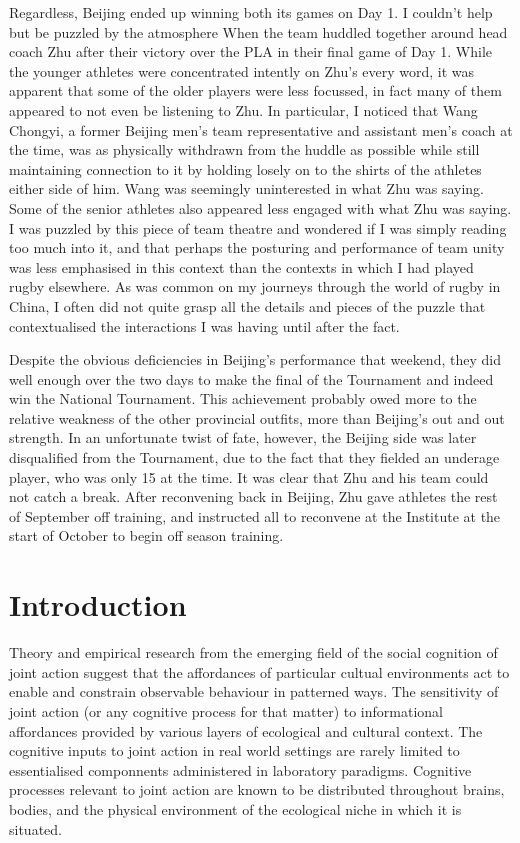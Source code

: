 Regardless, Beijing ended up winning both its games on Day 1. I couldn't help but be puzzled by the atmosphere When the team huddled together around head coach Zhu after their victory over the PLA in their final game of Day 1.  While the younger athletes were concentrated intently on Zhu's every word, it was apparent that some of the older players were less focussed, in fact many of them appeared to not even be listening to Zhu.  In particular, I noticed that Wang Chongyi, a former Beijing men's team representative and assistant men's coach at the time, was as physically withdrawn from the huddle as possible while still maintaining connection to it by holding losely on to the shirts of the athletes either side of him. Wang was seemingly uninterested in what Zhu was saying.  Some of the senior athletes also appeared less engaged with what Zhu was saying.  I was puzzled by this piece of team theatre and wondered if I was simply reading too much into it, and that perhaps the posturing and performance of team unity was less emphasised in this context than the contexts in which I had played rugby elsewhere. As was common on my journeys through the world of rugby in China, I often did not quite grasp all the details and pieces of the puzzle that contextualised the interactions I was having until after the fact.

Despite the obvious deficiencies in Beijing's performance that weekend, they did well enough over the two days to make the final of the Tournament and indeed win the National Tournament.  This achievement probably owed more to the relative weakness of the other provincial outfits, more than Beijing's out and out strength.  In an unfortunate twist of fate, however, the Beijing side was later disqualified from the Tournament, due to the fact that they fielded an underage player, who was only 15 at the time.  It was clear that Zhu and his team could not catch a break.  After reconvening back in Beijing, Zhu gave athletes the rest of September off training, and instructed all to reconvene at the Institute at the start of October to begin off season training.




\section{Introduction}

Theory and empirical research from the emerging field of the social cognition of joint action suggest that the affordances of particular cultual environments act to enable and constrain observable behaviour in patterned ways.  The sensitivity of joint action (or any cognitive process for that matter) to informational affordances provided by various layers of ecological and cultural context.  The cognitive inputs to joint action in real world settings are rarely limited to essentialised componnents administered in laboratory paradigms. Cognitive processes relevant to joint action are known to be distributed throughout brains, bodies, and the physical environment of the ecological niche in which it is situated.

